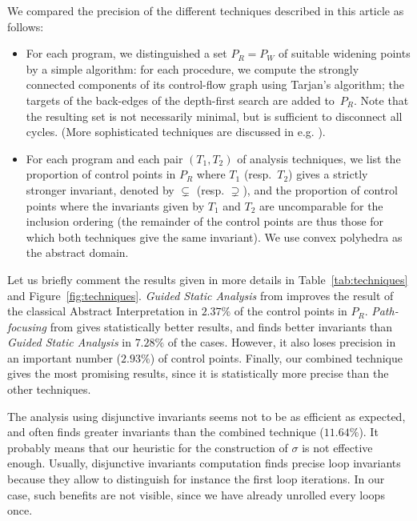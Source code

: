 \documentclass[preprint]{sigplanconf}
\begin{document}
We compared the precision of the different techniques described in this article as follows:
\begin{itemize}
\item For each program, we distinguished a set $P_R = P_W$ of suitable widening points by a simple algorithm: for each procedure, we compute the strongly connected components of its control-flow graph using Tarjan's algorithm; the targets of the back-edges of the depth-first search are added to~$P_R$. Note that the resulting set is not necessarily minimal, but is sufficient to disconnect all cycles.
(More sophisticated techniques are discussed in e.g. \citet{BourdonclePhd}).

\item For each program and each pair $(T_1,T_2)$ of analysis techniques, we list
	the proportion of control points in $P_R$ where $T_1$ (resp.~$T_2$) gives a
	strictly stronger invariant, denoted by $\subsetneq$ (resp. $\supsetneq$),
	and the proportion of control points where the invariants given by $T_1$ and
	$T_2$ are uncomparable for the inclusion ordering (the remainder of the
	control points are thus those for which both techniques give the same
	invariant). We use convex polyhedra as the abstract domain.
\end{itemize}


Let us briefly comment the results given in more details in Table~\ref{tab:techniques} and Figure~\ref{fig:techniques}.
\emph{Guided Static Analysis} from \citet{DBLP:conf/sas/GopanR07} improves the
result of the classical Abstract Interpretation in $2.37\%$ of the control points
in $P_R$.
\emph{Path-focusing} from \citet{Monniaux_Gonnord_SAS11} gives
statistically better results, and finds better invariants than \emph{Guided
Static Analysis} in $7.28\%$ of the cases. However, it also loses precision in an
important number ($2.93\%$) of control points.
Finally, our combined technique gives the most promising results, since it is
statistically more precise than the other techniques.

The analysis using disjunctive invariants seems not to be as efficient as
expected, and often finds greater invariants than the combined technique
($11.64\%$). It probably means that our heuristic for the construction of
$\sigma$ is not effective enough. Usually, disjunctive invariants computation
finds precise loop invariants because they allow to distinguish for
instance the first loop iterations. In our case, such benefits are not
visible, since we have already unrolled every loops once.
\end{document}
